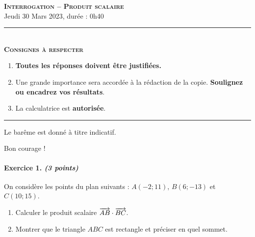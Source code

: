 \documentclass[11pt]{article}
\begin{document}

%

\begin{center}
\textbf{\LARGE \textsc{Interrogation -- Produit scalaire}}\\[2mm]

{\large Jeudi 30 Mars 2023, durée : 0h40}\\[1mm]
\noindent\rule{8cm}{0.4pt}\\[1mm]
\textbf{\textsc{Consignes à respecter}}
\begin{enumerate}[label=\textbf{\arabic*/}]
\item \textbf{Toutes les réponses doivent être justifiées.}
\item Une grande importance sera accordée à la rédaction de la
  copie. \textbf{Soulignez ou encadrez vos résultats}.
\item La calculatrice est \textbf{autorisée}.
    \end{enumerate}
\noindent\rule{12cm}{0.4pt}
\end{center}

\vspace{2mm}
\noindent Le barême est donné à titre indicatif.
\vspace{2mm}
\begin{center}
  Bon courage !
\end{center}

\paragraph{Exercice 1. \emph{(3 points)}}
On considère les points du plan suivants : $A(-2; 11)$, $B(6; -13)$ et
$C(10; 15)$.
\begin{enumerate}
  \item Calculer le produit scalaire $\overrightarrow{AB}\cdot\overrightarrow{BC}$.
  \item Montrer que le triangle $ABC$ est rectangle et préciser en quel sommet.
\end{enumerate}
\end{document}
